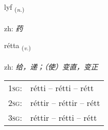 \documentclass[frontgrid, backgrid]{flacards}\usepackage[]{graphicx}\usepackage[]{color}
\begin{document}
\renewcommand{\flhead}{\vskip5pt \fboxsep=0pt {\small\bfseries\footnotesize Nafnorð | 名词}}
\renewcommand{\fcfoot}{\vskip5pt \fboxsep=0pt \hspace{2pt}{\small\bfseries\footnotesize 2K}}

\renewcommand{\blhead}{\vskip5pt {\small\bfseries\footnotesize Nafnorð | 名词 }}
\renewcommand{\bcfoot}{\vskip5pt \hspace{2pt}{\small\bfseries\footnotesize 2K}}


{lyf \small{\textsubscript{(\textit{n.})}} \\[1ex] %
\textphonetic{[lɪːv]} \\
zh: \emph{药} \\  [2ex]
\renewcommand*{\arraystretch}{0.8}
}

\renewcommand{\flhead}{\vskip5pt \fboxsep=0pt {\small\bfseries\footnotesize Sagnorð | 动词}}
\renewcommand{\fcfoot}{\vskip5pt \fboxsep=0pt \hspace{2pt}{\small\bfseries\footnotesize 2K}}

\renewcommand{\blhead}{\vskip5pt {\small\bfseries\footnotesize Sagnorð | 动词 }}
\renewcommand{\bcfoot}{\vskip5pt \hspace{2pt}{\small\bfseries\footnotesize 2K}}


{rétta \small{\textsubscript{(\textit{v.})}} \\[1ex] %
\textphonetic{[rjɛhta]} \\
zh: \emph{给，递；（使）变直，变正} \\  [2ex]
\renewcommand*{\arraystretch}{0.8}
\begin{tabular}{p{1cm}l}
\textsc{1sg}: & rétti -- rétti -- rétt \\ 
\textsc{2sg}: & réttir -- réttir -- rétt \\ 
\textsc{3sg}: & réttir -- rétti -- rétt \\ 
\end{tabular}
}
\end{document}
